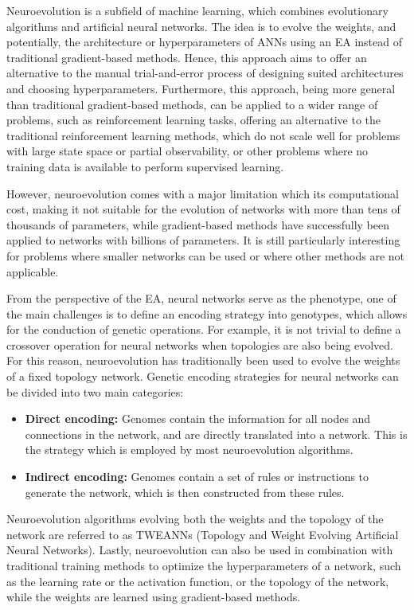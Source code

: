 Neuroevolution is a subfield of machine learning, which combines evolutionary algorithms and artificial neural networks. The idea is to evolve the weights,
and potentially, the architecture or hyperparameters of ANNs using an EA instead of traditional gradient-based methods. Hence, this approach aims to
offer an alternative to the manual trial-and-error process of designing suited architectures and choosing hyperparameters. Furthermore, this approach,
being more general than traditional gradient-based methods, can be applied to a wider range of problems, such as reinforcement learning tasks, offering an
alternative to the traditional reinforcement learning methods, which do not scale well for problems with large state space or partial observability,
or other problems where no training data is available to perform supervised learning.

However, neuroevolution comes with a major limitation which its computational cost, making it not suitable for the evolution of networks with more than
tens of thousands of parameters, while gradient-based methods have successfully been applied to networks with billions of parameters. It is still particularly
interesting for problems where smaller networks can be used or where other methods are not applicable.

From the perspective of the EA, neural networks serve as the phenotype, one of the main challenges is to define an encoding strategy into genotypes, which
allows for the conduction of genetic operations. For example, it is not trivial to define a crossover operation for neural networks when topologies are also
being evolved. For this reason, neuroevolution has traditionally  been used to evolve the weights of a fixed topology network. Genetic encoding strategies
for neural networks can be divided into two main categories:

\begin{itemize}
    \item \textbf{Direct encoding:} Genomes contain the information for all nodes and connections in the network, and are directly translated into a network. This
    is the strategy which is employed by most neuroevolution algorithms.
    \item \textbf{Indirect encoding:} Genomes contain a set of rules or instructions to generate the network, which is then constructed from these rules.
\end{itemize}

Neuroevolution algorithms evolving both the weights and the topology of the network are referred to as TWEANNs (Topology and Weight Evolving Artificial Neural Networks).
Lastly, neuroevolution can also be used in combination with traditional training methods to optimize the hyperparameters of a network, such as the learning rate or the
activation function, or the topology of the network, while the weights are learned using gradient-based methods.
